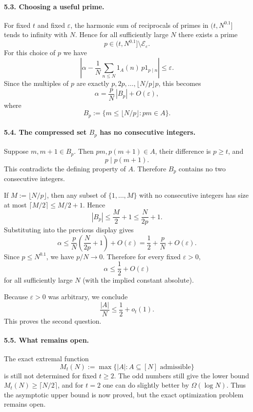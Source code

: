 \paragraph{5.3. Choosing a useful prime.}
For fixed $t$ and fixed $\varepsilon$, the harmonic sum of reciprocals of primes in $(t,N^{0.1}]$ tends to infinity with $N$. Hence for all sufficiently large $N$ there exists a prime
\[
p\in (t,N^{0.1}]\setminus \mathcal E_\varepsilon.
\]
For this choice of $p$ we have
\[
\left|
\alpha-
\frac1N\sum_{n\le N}1_A(n)\,p1_{p\mid n}
\right|
\le \varepsilon.
\]
Since the multiples of $p$ are exactly $p,2p,\dots,\lfloor N/p\rfloor p$, this becomes
\[
\alpha = \frac{p}{N}\,|B_p| + O(\varepsilon),
\]
where
\[
B_p:=\{m\le \lfloor N/p\rfloor: pm\in A\}.
\]

\paragraph{5.4. The compressed set $B_p$ has no consecutive integers.}
Suppose $m,m+1\in B_p$. Then $pm,p(m+1)\in A$, their difference is $p\ge t$, and
\[
p\mid p(m+1).
\]
This contradicts the defining property of $A$. Therefore $B_p$ contains no two consecutive integers.

If $M:=\lfloor N/p\rfloor$, then any subset of $\{1,\dots,M\}$ with no consecutive integers has size at most $\lceil M/2\rceil\le M/2+1$. Hence
\[
|B_p|\le \frac{M}{2}+1 \le \frac{N}{2p}+1.
\]
Substituting into the previous display gives
\[
\alpha
\le \frac{p}{N}\left(\frac{N}{2p}+1\right)+O(\varepsilon)
= \frac12 + \frac{p}{N}+O(\varepsilon).
\]
Since $p\le N^{0.1}$, we have $p/N\to 0$. Therefore for every fixed $\varepsilon>0$,
\[
\alpha\le \frac12 + O(\varepsilon)
\]
for all sufficiently large $N$ (with the implied constant absolute).

Because $\varepsilon>0$ was arbitrary, we conclude
\[
\frac{|A|}{N}\le \frac12 + o_t(1).
\]
This proves the second question.

\paragraph{5.5. What remains open.}
The exact extremal function
\[
M_t(N):=\max\{|A|: A\subseteq [N]\text{ admissible}\}
\]
is still not determined for fixed $t\ge 2$. The odd numbers still give the lower bound $M_t(N)\ge \lceil N/2\rceil$, and for $t=2$ one can do slightly better by $\Omega(\log N)$. Thus the asymptotic upper bound is now proved, but the exact optimization problem remains open.


